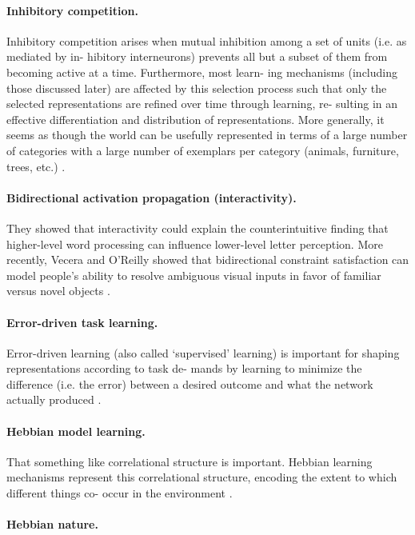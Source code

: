 \paragraph{Inhibitory competition.} Inhibitory competition arises when mutual
inhibition among a set of units (i.e. as mediated by in-
hibitory interneurons) prevents all but a subset of them
from becoming active at a time.  Furthermore, most learn-
ing mechanisms (including those discussed later) are
affected by this selection process such that only the selected
representations are refined over time through learning, re-
sulting in an effective differentiation and distribution of
representations. More generally, it seems as though the world can be usefully
represented in terms of a large number of categories with a
large number of exemplars per category (animals, furniture,
trees, etc.) \cite{hinton1988learning}. 

\paragraph{Bidirectional activation propagation (interactivity).} They showed that
interactivity could explain the counterintuitive finding that
higher-level word processing can influence lower-level letter
perception. More recently, Vecera and O’Reilly showed
that bidirectional constraint satisfaction can model people’s
ability to resolve ambiguous visual inputs in favor of familiar
versus novel objects \cite{hinton1988learning}. 

\paragraph{Error-driven task learning.} Error-driven learning (also called ‘supervised’ learning) is
important for shaping representations according to task de-
mands by learning to minimize the difference (i.e. the error)
between a desired outcome and what the network actually
produced \cite{hinton1988learning}. 

\paragraph{Hebbian model learning.} That something like correlational structure is important.
Hebbian learning mechanisms represent this correlational
structure, encoding the extent to which different things co-
occur in the environment \cite{hinton1988learning}.


\paragraph{Hebbian nature.}

